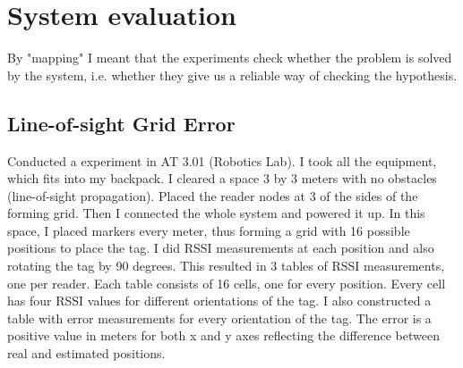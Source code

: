 \section{System evaluation}
\label{sec:syseval}

By "mapping" I meant that the experiments check whether the problem is solved by the system, i.e. whether they give us a reliable way of checking the hypothesis. 

\subsection{Line-of-sight Grid Error}

Conducted a experiment in AT 3.01 (Robotics Lab). I took all the equipment, which fits into my backpack. I cleared a space 3 by 3 meters with no obstacles (line-of-sight propagation). Placed the reader nodes at 3 of the sides of the forming grid. Then I connected the whole system and powered it up. In this space, I placed markers every meter, thus forming a grid with 16 possible positions to place the tag. I did RSSI measurements at each position and also rotating the tag by 90 degrees. This resulted in 3 tables of RSSI measurements, one per reader. Each table consists of 16 cells, one for every position. Every cell has four RSSI values for different orientations of the tag. I also constructed a table with error measurements for every orientation of the tag. The error is a positive value in meters for both x and y axes reflecting the difference between real and estimated positions. 

